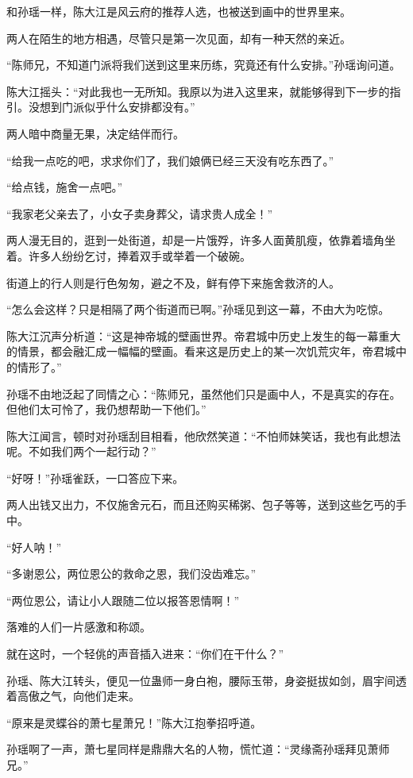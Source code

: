 \begin{this_body}
和孙瑶一样，陈大江是风云府的推荐人选，也被送到画中的世界里来。

两人在陌生的地方相遇，尽管只是第一次见面，却有一种天然的亲近。

“陈师兄，不知道门派将我们送到这里来历练，究竟还有什么安排。”孙瑶询问道。

陈大江摇头：“对此我也一无所知。我原以为进入这里来，就能够得到下一步的指引。没想到门派似乎什么安排都没有。”

两人暗中商量无果，决定结伴而行。

“给我一点吃的吧，求求你们了，我们娘俩已经三天没有吃东西了。”

“给点钱，施舍一点吧。”

“我家老父亲去了，小女子卖身葬父，请求贵人成全！”

两人漫无目的，逛到一处街道，却是一片饿殍，许多人面黄肌瘦，依靠着墙角坐着。许多人纷纷乞讨，捧着双手或举着一个破碗。

街道上的行人则是行色匆匆，避之不及，鲜有停下来施舍救济的人。

“怎么会这样？只是相隔了两个街道而已啊。”孙瑶见到这一幕，不由大为吃惊。

陈大江沉声分析道：“这是神帝城的壁画世界。帝君城中历史上发生的每一幕重大的情景，都会融汇成一幅幅的壁画。看来这是历史上的某一次饥荒灾年，帝君城中的情形了。”

孙瑶不由地泛起了同情之心：“陈师兄，虽然他们只是画中人，不是真实的存在。但他们太可怜了，我仍想帮助一下他们。”

陈大江闻言，顿时对孙瑶刮目相看，他欣然笑道：“不怕师妹笑话，我也有此想法呢。不如我们两个一起行动？”

“好呀！”孙瑶雀跃，一口答应下来。

两人出钱又出力，不仅施舍元石，而且还购买稀粥、包子等等，送到这些乞丐的手中。

“好人呐！”

“多谢恩公，两位恩公的救命之恩，我们没齿难忘。”

“两位恩公，请让小人跟随二位以报答恩情啊！”

落难的人们一片感激和称颂。

就在这时，一个轻佻的声音插入进来：“你们在干什么？”

孙瑶、陈大江转头，便见一位蛊师一身白袍，腰际玉带，身姿挺拔如剑，眉宇间透着高傲之气，向他们走来。

“原来是灵蝶谷的萧七星萧兄！”陈大江抱拳招呼道。

孙瑶啊了一声，萧七星同样是鼎鼎大名的人物，慌忙道：“灵缘斋孙瑶拜见萧师兄。”


\end{this_body}

